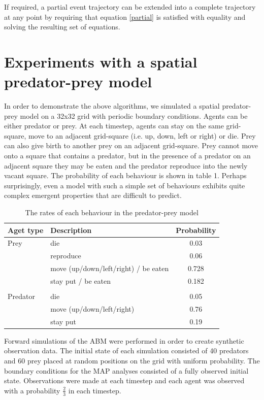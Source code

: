 \documentclass{article}
\begin{document}
If required, a partial event trajectory can be extended into a complete trajectory at any point by requiring that equation \ref{partial} is satisfied with equality and solving the resulting set of equations.

\section{Experiments with a spatial predator-prey model}

In order to demonstrate the above algorithms, we simulated a spatial predator-prey model on a 32x32 grid with periodic boundary conditions. Agents can be either predator or prey. At each timestep, agents can stay on the same grid-square, move to an adjacent grid-square (i.e. up, down, left or right) or die. Prey can also give birth to another prey on an adjacent grid-square. Prey cannot move onto a square that contains a predator, but in the presence of a predator on an adjacent square they may be eaten and the predator reproduce into the newly vacant square. The probability of each behaviour is shown in table 1. Perhaps surprisingly, even a model with such a simple set of behaviours exhibits quite complex emergent properties that are difficult to predict.


\begin{table}
\begin{center}
\begin{tabular}{llc}
\hline
Aget type & Description & Probability\\
\hline
Prey & die &        0.03\\
 & reproduce &        0.06\\
 & move (up/down/left/right) / be eaten &        0.728\\
 & stay put / be eaten &  0.182 \\
 &&\\
Predator & die  &      0.05\\
 & move (up/down/left/right)&        0.76\\
 & stay put & 0.19\\
\hline
\end{tabular}
\end{center}
\caption{The rates of each behaviour in the predator-prey model}
\label{rates}
\end{table}



Forward simulations of the ABM were performed in order to create synthetic observation data. The initial state of each simulation consisted of 40 predators and 60 prey placed at random positions on the grid with uniform probability. The boundary conditions for the MAP analyses consisted of a fully observed initial state. Observations were made at each timestep and each agent was observed with a probability $\frac{2}{3}$ in each timestep.
\end{document}
